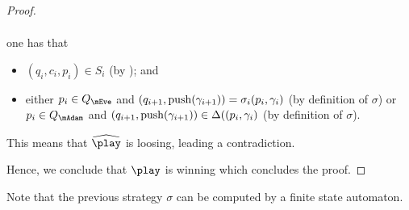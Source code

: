 \begin{proof}
\begin{itemize}
\begin{equation*}
\begin{split}
\end{split}
\end{equation*}
one has that 
\begin{itemize}
	\item $(q_i,c_i,p_i)\in S_i$ (by ); and 
	\item either $p_i\in Q_\mEve$ and $(q_{i+1},\mathrm{push}(\gamma_{i+1}))=\sigma_i(p_i,\gamma_i)$ (by definition of $\sigma$) or $p_i\in Q_\mAdam$ and $(q_{i+1},\mathrm{push}(\gamma_{i+1}))\in \Delta((p_i,\gamma_i)$  (by definition of $\sigma$).
\end{itemize}
This means that $\hplay$ is loosing, leading a contradiction.
	\end{itemize}
Hence, we conclude that $\play$ is winning which concludes the proof.
\end{proof}

\begin{remark}
Note that the previous strategy $\sigma$ can be computed by a finite state automaton.
\end{remark}

